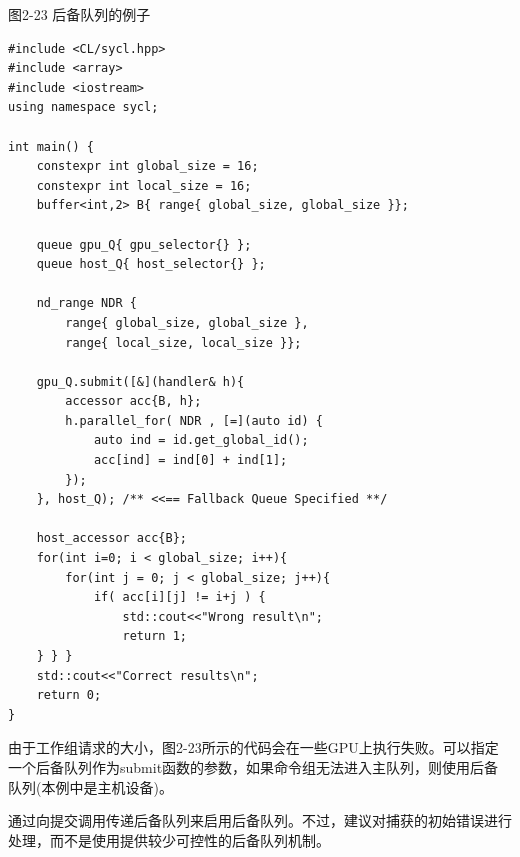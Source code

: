 \hspace*{\fill} \par %
图2-23 后备队列的例子
\begin{lstlisting}[caption={}]
#include <CL/sycl.hpp>
#include <array>
#include <iostream>
using namespace sycl;

int main() {
	constexpr int global_size = 16;
	constexpr int local_size = 16;
	buffer<int,2> B{ range{ global_size, global_size }};
	
	queue gpu_Q{ gpu_selector{} };
	queue host_Q{ host_selector{} };
	
	nd_range NDR {
		range{ global_size, global_size },
		range{ local_size, local_size }};
	
	gpu_Q.submit([&](handler& h){
		accessor acc{B, h};
		h.parallel_for( NDR , [=](auto id) {
			auto ind = id.get_global_id();
			acc[ind] = ind[0] + ind[1];
		});
	}, host_Q); /** <<== Fallback Queue Specified **/

	host_accessor acc{B};
	for(int i=0; i < global_size; i++){
		for(int j = 0; j < global_size; j++){
			if( acc[i][j] != i+j ) {
				std::cout<<"Wrong result\n";
				return 1;
	} } }
	std::cout<<"Correct results\n";
	return 0;
}
\end{lstlisting}

由于工作组请求的大小，图2-23所示的代码会在一些GPU上执行失败。可以指定一个后备队列作为submit函数的参数，如果命令组无法进入主队列，则使用后备队列(本例中是主机设备)。\par

\begin{tcolorbox}[colback=red!5!white,colframe=red!75!black]
通过向提交调用传递后备队列来启用后备队列。不过，建议对捕获的初始错误进行处理，而不是使用提供较少可控性的后备队列机制。
\end{tcolorbox}
